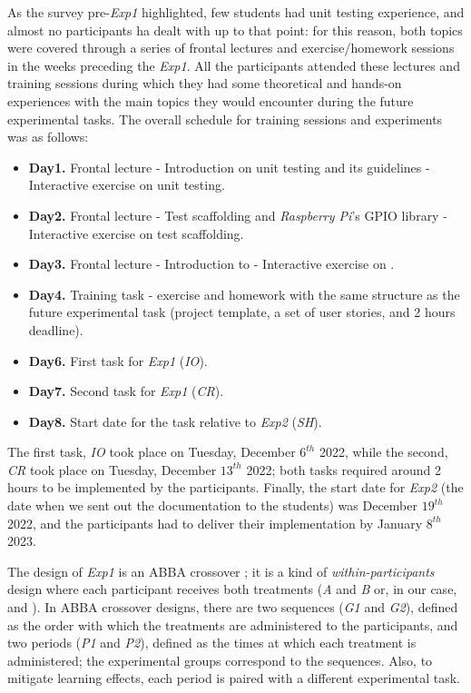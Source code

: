 As the survey pre-\textit{Exp1} highlighted, few students had unit testing experience, and almost no participants ha dealt with \tdd up to that point: for this reason, both topics were covered through a series of frontal lectures and exercise/homework sessions in the weeks preceding the \textit{Exp1}. All the participants attended these lectures and training sessions during which they had some theoretical and hands-on experiences with the main topics they would encounter during the future experimental tasks. The overall schedule for training sessions and experiments was as follows:
\begin{itemize}
    \item \textbf{Day1.} Frontal lecture - Introduction on unit testing and its guidelines - Interactive exercise on unit testing.
    \item \textbf{Day2.} Frontal lecture - Test scaffolding and \textit{Raspberry Pi}'s GPIO library - Interactive exercise on test scaffolding.
    \item \textbf{Day3.} Frontal lecture - Introduction to \tdd - Interactive exercise on \tdd.
    \item \textbf{Day4.} Training task - \tdd exercise and homework with the same structure as the future experimental task (\ie project template, a set of user stories, and 2 hours deadline).
    \item \textbf{Day6.} First task for \textit{Exp1} (\textit{IO}).
    \item \textbf{Day7.} Second task for \textit{Exp1} (\textit{CR}).
    \item \textbf{Day8.} Start date for the task relative to \textit{Exp2} (\textit{SH}).
\end{itemize}


The first task, \textit{IO} took place on Tuesday, December $6^{th}$ 2022, while the second, \textit{CR} took place on Tuesday, December $13^{th}$ 2022; both tasks required around 2 hours to be implemented by the participants. Finally, the start date for \textit{Exp2} (\ie the date when we sent out the documentation to the students) was December $19^{th}$ 2022, and the participants had to deliver their implementation by January $8^{th}$ 2023.

The design of \textit{Exp1} is an ABBA crossover \cite{DBLP:journals/tse/VegasAJ16}; it is a kind of \textit{within-participants} design where each participant receives both treatments (\ie \textit{A} and \textit{B} or, in our case, \tdd and \notdd). In ABBA crossover designs, there are two sequences (\ie \textit{G1} and \textit{G2}), defined as the order with which the treatments are administered to the participants, and two periods (\ie \textit{P1} and \textit{P2}), defined as the times at which each treatment is administered; the experimental groups correspond to the sequences. Also, to mitigate learning effects, each period is paired with a
different experimental task.

